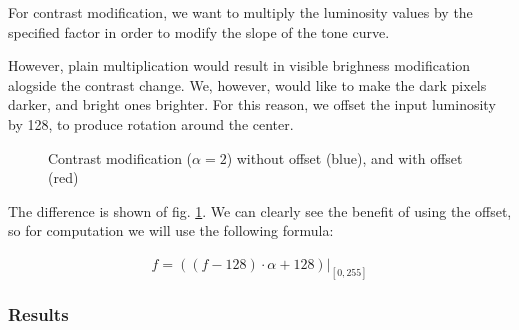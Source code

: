 \documentclass[12pt]{article}
\theoremstyle{definition}
\begin{document}
For contrast modification, we want to multiply the luminosity values by the specified factor
in order to modify the slope of the tone curve.

However, plain multiplication would result in visible brighness modification alogside the contrast change.
We, however, would like to make the dark pixels darker, and bright ones brighter.
For this reason, we offset the input luminosity by 128, to produce rotation around the center.

\begin{figure}[ht]\centering
    \caption{Contrast modification ($\alpha = 2$) without offset (blue), and with offset (red)}
    \label{fig:contrast-differences}
\end{figure}

The difference is shown of fig. \ref{fig:contrast-differences}.
We can clearly see the benefit of using the offset, so for computation we will use the following formula:

\begin{equation}
    \hat{f} = \left((f - 128) \cdot \alpha + 128\right)\Big|_{[0,255]}
\end{equation}

\subsubsection{Results}
\end{document}
